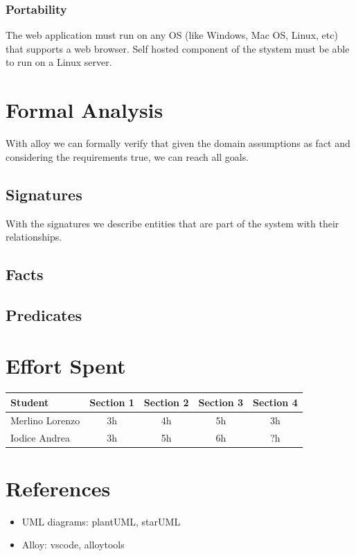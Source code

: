 \documentclass{article}
\begin{document}
\subsubsection{Portability}			
The web application must run on any OS (like Windows, Mac OS, Linux, etc) that supports a web browser.
Self hosted component of the stystem must be able to run on a Linux server.

\newpage
\section{Formal Analysis}
With alloy we can formally verify that given the domain assumptions as fact and considering the requirements true, we can reach all goals.

\subsection{Signatures}
With the signatures we describe entities that are part of the system with their relationships.

\subsection{Facts}

\subsection{Predicates}

\newpage
\section{Effort Spent}
\begin{center}
\begin{tabular}{||l|c|c|c|c||}
\hline
Student & Section 1 & Section 2 & Section 3 & Section 4
\\
\hline
Merlino Lorenzo & 3h & 4h & 5h & 3h
\\
\hline
Iodice Andrea & 3h & 5h & 6h & ?h
\\
\hline
\end{tabular}
\end{center}

\newpage
\section{References}
\begin{itemize}
\item UML diagrams: plantUML, starUML
\item Alloy: vscode, alloytools
\end{itemize}
\end{document}
